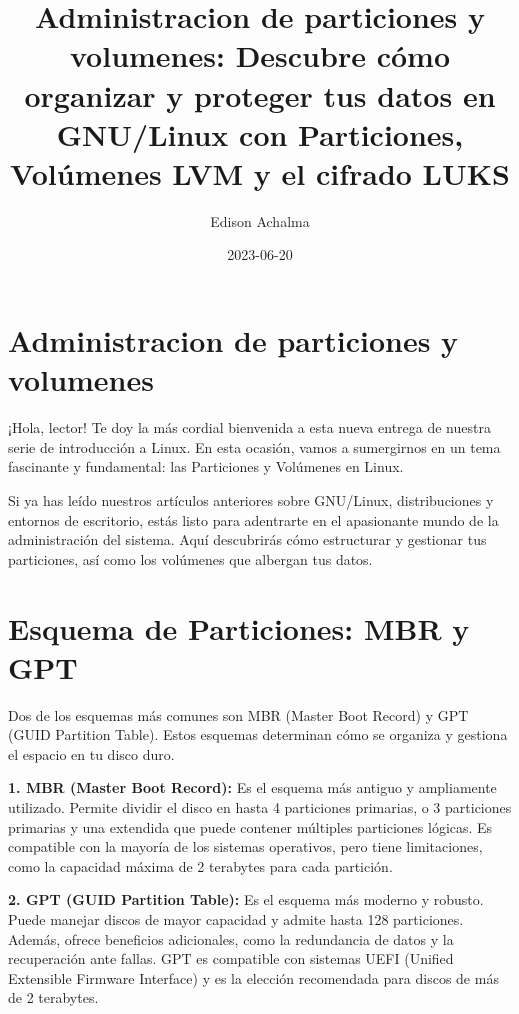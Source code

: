 \documentclass[
  jou,
  floatsintext,
  longtable,
  a4paper,
  nolmodern,
  notxfonts,
  notimes,
  colorlinks=true,linkcolor=blue,citecolor=blue,urlcolor=blue]{apa7}
\title{Administracion de particiones y volumenes: Descubre cómo
organizar y proteger tus datos en GNU/Linux con Particiones, Volúmenes
LVM y el cifrado LUKS}
\author{Edison Achalma}
\affiliation{
{Escuela Profesional de Economía, Universidad Nacional de San Cristóbal
de Huamanga}}
\date{2023-06-20}
\begin{document}
\maketitle

\hypertarget{toc}{}
\tableofcontents
\newpage
\section[Introduction]{Administracion de particiones y volumenes}

\setcounter{secnumdepth}{5}

\setlength\LTleft{0pt}


¡Hola, lector! Te doy la más cordial bienvenida a esta nueva entrega de
nuestra serie de introducción a Linux. En esta ocasión, vamos a
sumergirnos en un tema fascinante y fundamental: las Particiones y
Volúmenes en Linux.

Si ya has leído nuestros artículos anteriores sobre GNU/Linux,
distribuciones y entornos de escritorio, estás listo para adentrarte en
el apasionante mundo de la administración del sistema. Aquí descubrirás
cómo estructurar y gestionar tus particiones, así como los volúmenes que
albergan tus datos.

\section{Esquema de Particiones: MBR y
GPT}\label{esquema-de-particiones-mbr-y-gpt}

Dos de los esquemas más comunes son MBR (Master Boot Record) y GPT (GUID
Partition Table). Estos esquemas determinan cómo se organiza y gestiona
el espacio en tu disco duro.

\textbf{1. MBR (Master Boot Record):} Es el esquema más antiguo y
ampliamente utilizado. Permite dividir el disco en hasta 4 particiones
primarias, o 3 particiones primarias y una extendida que puede contener
múltiples particiones lógicas. Es compatible con la mayoría de los
sistemas operativos, pero tiene limitaciones, como la capacidad máxima
de 2 terabytes para cada partición.

\textbf{2. GPT (GUID Partition Table):} Es el esquema más moderno y
robusto. Puede manejar discos de mayor capacidad y admite hasta 128
particiones. Además, ofrece beneficios adicionales, como la redundancia
de datos y la recuperación ante fallas. GPT es compatible con sistemas
UEFI (Unified Extensible Firmware Interface) y es la elección
recomendada para discos de más de 2 terabytes.
\end{document}

